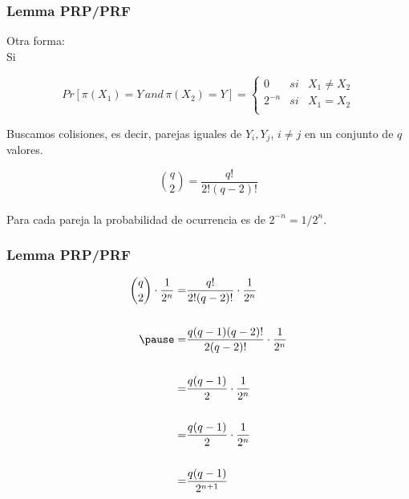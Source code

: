 \documentclass{beamer}
\begin{document}
\frame
{
	\frametitle{Lemma PRP/PRF}
	
	Otra forma:\\
	
	Si
	
	\begin{equation*}
	Pr\left[ \pi(X_1)=Y\,and\,\pi(X_2)=Y \right] = \left\{ \begin{array}{ccc}
	0 & si & X_1\neq X_2\\
	2^{-n} & si & X_1 = X_2\\
	\end{array}
\right.
    \end{equation*}	 
\pause

Buscamos colisiones, es decir, parejas iguales de $Y_i,Y_j$, $i\neq j$ en un conjunto de $q$ valores.\\

\pause

$$  \displaystyle{\binom{q}{2} = \frac{q!}{2!(q-2)!}}$$\\

Para cada pareja la probabilidad de ocurrencia es de $2^{-n}=1/2^n$.

}

\frame
{
	\frametitle{Lemma PRP/PRF}
\begin{align*}
 \displaystyle{\binom{q}{2} \cdot \frac{1}{2^n}} =& \frac{q!}{2!(q-2)!}\cdot\frac{1}{2^n}\\ \\\pause
=& \frac{q(q-1)(q-2)!}{2(q-2)!}\cdot\frac{1}{2^n}\\ \\
=& \frac{q(q-1)}{2} \cdot\frac{1}{2^n}\\ \\
=& \frac{q(q-1)}{2} \cdot\frac{1}{2^n}\\ \\
=& \frac{q(q-1)}{2^{n+1}}\\ \\
\end{align*}
}
\end{document}
